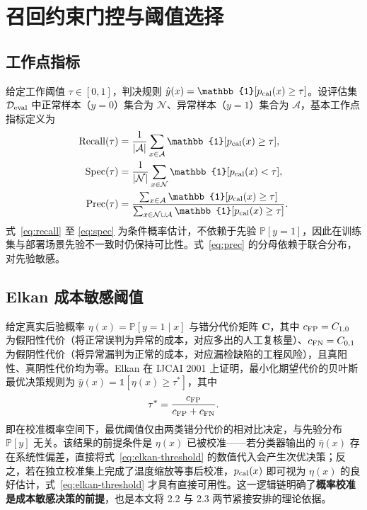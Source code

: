 \documentclass[UTF8,openany,12pt]{ctexbook}
\begin{document}
\section{召回约束门控与阈值选择}

\subsection{工作点指标}
给定工作阈值 $\tau \in [0, 1]$，判决规则 $\hat{y}(x) = \mathbb{1}[p_{\rm cal}(x) \geq \tau]$。设评估集 $\mathcal{D}_{\rm eval}$ 中正常样本（$y=0$）集合为 $\mathcal{N}$、异常样本（$y=1$）集合为 $\mathcal{A}$，基本工作点指标定义为
\begin{align}
\mathrm{Recall}(\tau) &= \frac{1}{|\mathcal{A}|}\sum_{x \in \mathcal{A}} \mathbb{1}[p_{\rm cal}(x) \geq \tau], \label{eq:recall}\\
\mathrm{Spec}(\tau) &= \frac{1}{|\mathcal{N}|}\sum_{x \in \mathcal{N}} \mathbb{1}[p_{\rm cal}(x) < \tau], \label{eq:spec}\\
\mathrm{Prec}(\tau) &= \frac{\sum_{x \in \mathcal{A}}\mathbb{1}[p_{\rm cal}(x) \geq \tau]}{\sum_{x \in \mathcal{N} \cup \mathcal{A}}\mathbb{1}[p_{\rm cal}(x) \geq \tau]}. \label{eq:prec}
\end{align}
式~\eqref{eq:recall} 至 \eqref{eq:spec} 为条件概率估计，不依赖于先验 $\mathbb{P}[y=1]$，因此在训练集与部署场景先验不一致时仍保持可比性。式~\eqref{eq:prec} 的分母依赖于联合分布，对先验敏感。

\subsection{Elkan 成本敏感阈值}
给定真实后验概率 $\eta(x) = \mathbb{P}[y = 1 \mid x]$ 与错分代价矩阵 $\mathbf{C}$，其中 $c_{\rm FP} = C_{1,0}$ 为假阳性代价（将正常误判为异常的成本，对应多出的人工复核量）、$c_{\rm FN} = C_{0,1}$ 为假阴性代价（将异常漏判为正常的成本，对应漏检缺陷的工程风险），且真阳性、真阴性代价均为零。Elkan\cite{elkan2001foundations} 在 IJCAI 2001 上证明，最小化期望代价的贝叶斯最优决策规则为 $\hat{y}(x) = \mathbb{1}[\eta(x) \geq \tau^{\ast}]$，其中
\begin{equation}
\tau^{\ast} = \frac{c_{\rm FP}}{c_{\rm FP} + c_{\rm FN}}.
\label{eq:elkan-threshold}
\end{equation}
即在校准概率空间下，最优阈值仅由两类错分代价的相对比决定，与先验分布 $\mathbb{P}[y]$ 无关。该结果的前提条件是 $\eta(x)$ 已被校准——若分类器输出的 $\hat{\eta}(x)$ 存在系统性偏差，直接将式~\eqref{eq:elkan-threshold} 的数值代入会产生次优决策；反之，若在独立校准集上完成了温度缩放等事后校准，$p_{\rm cal}(x)$ 即可视为 $\eta(x)$ 的良好估计，式~\eqref{eq:elkan-threshold} 才具有直接可用性。这一逻辑链明确了\textbf{概率校准是成本敏感决策的前提}，也是本文将 2.2 与 2.3 两节紧接安排的理论依据。
\end{document}
